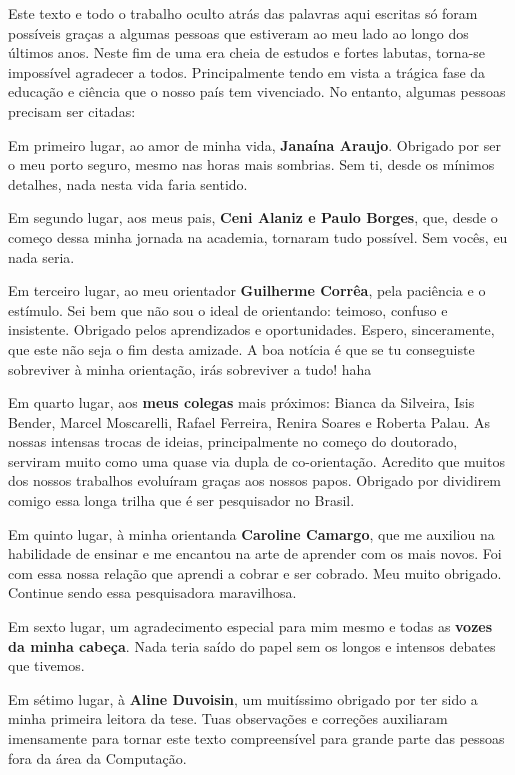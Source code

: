 \documentclass[tese,capa]{texufpel}
\begin{document}
\begin{agradecimentos}
Este texto e todo o trabalho oculto atrás das palavras aqui escritas só foram possíveis graças a algumas pessoas que estiveram ao meu lado ao longo dos últimos anos. Neste fim de uma era cheia de estudos e fortes labutas, torna-se impossível agradecer a todos. Principalmente tendo em vista a trágica fase da educação e ciência que o nosso país tem vivenciado. No entanto, algumas pessoas precisam ser citadas:
  
Em primeiro lugar, ao amor de minha vida, \textbf{Janaína Araujo}. Obrigado por ser o meu porto seguro, mesmo nas horas mais sombrias. Sem ti, desde os mínimos detalhes, nada nesta vida faria sentido.
  
Em segundo lugar, aos meus pais, \textbf{Ceni Alaniz e Paulo Borges}, que, desde o começo dessa minha jornada na academia, tornaram tudo possível. Sem vocês, eu nada seria.

Em terceiro lugar, ao meu orientador \textbf{Guilherme Corrêa}, pela paciência e o estímulo. Sei bem que não sou o ideal de orientando: teimoso, confuso e insistente. Obrigado pelos aprendizados e oportunidades. Espero, sinceramente, que este não seja o fim desta amizade. A boa notícia é que se tu conseguiste sobreviver à minha orientação, irás sobreviver a tudo! haha
  
Em quarto lugar, aos \textbf{meus colegas} mais próximos: Bianca da Silveira, Isis Bender, Marcel Moscarelli, Rafael Ferreira, Renira Soares e Roberta Palau. As nossas intensas trocas de ideias, principalmente no começo do doutorado, serviram muito como uma quase via dupla de co-orientação. Acredito que muitos dos nossos trabalhos evoluíram graças aos nossos papos. Obrigado por dividirem comigo essa longa trilha que é ser pesquisador no Brasil.
  
Em quinto lugar, à minha orientanda \textbf{Caroline Camargo}, que me auxiliou na habilidade de ensinar e me encantou na arte de aprender com os mais novos. Foi com essa nossa relação que aprendi a cobrar e ser cobrado. Meu muito obrigado. Continue sendo essa pesquisadora maravilhosa.

Em sexto lugar, um agradecimento especial para mim mesmo e todas as \textbf{vozes da minha cabeça}. Nada teria saído do papel sem os longos e intensos debates que tivemos.

Em sétimo lugar, à \textbf{Aline Duvoisin}, um muitíssimo obrigado por ter sido a minha primeira leitora da tese. Tuas observações e correções auxiliaram imensamente para tornar este texto compreensível para grande parte das pessoas fora da área da Computação. 


\end{agradecimentos}
\end{document}

